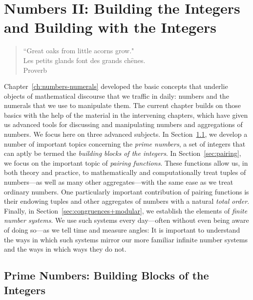 
\chapter{Numbers II:
Building the Integers and Building with the Integers}
\label{ch:numbers-advanced}

\begin{quote}
``Great oaks from little acorns grow." \\
Les petits glands font des grands ch$\hat{\mbox{e}}$nes. \\
\hspace*{1.5in}Proverb
\end{quote}

Chapter~\ref{ch:numbers-numerals} developed the basic concepts that underlie objects of mathematical discourse that we traffic in daily: numbers and the numerals that we use to manipulate them.  The current chapter builds on those basics with the help of the material in the intervening chapters, which have given us advanced tools for discussing and manipulating numbers and aggregations of numbers.  We focus here on three advanced subjects.  In Section~\ref{sec:primes}, we develop a number of important topics concerning the {\em prime numbers}, a set of integers that can aptly be termed the {\it building blocks of the integers}.  In
Section~\ref{sec:pairing}, we focus on the important topic of {\it pairing functions}.  These functions allow us, in both theory and practice, to mathematically and computationally treat tuples of
numbers---as well as many other aggregates---with the same ease as we treat ordinary numbers.  One particularly important contribution of pairing functions is their endowing tuples and other aggregates of numbers with a natural {\em total order}.  Finally, in Section~\ref{sec:congruences+modular}, we establish the elements of {\em finite number systems}.  We use such systems every day---often without even being aware of doing so---as we tell time and measure angles: It is important to understand the ways in which such systems mirror our more familiar infinite number systems and the ways in which ways they do not.
 

\section{Prime Numbers: Building Blocks of the Integers}
\label{sec:primes}

